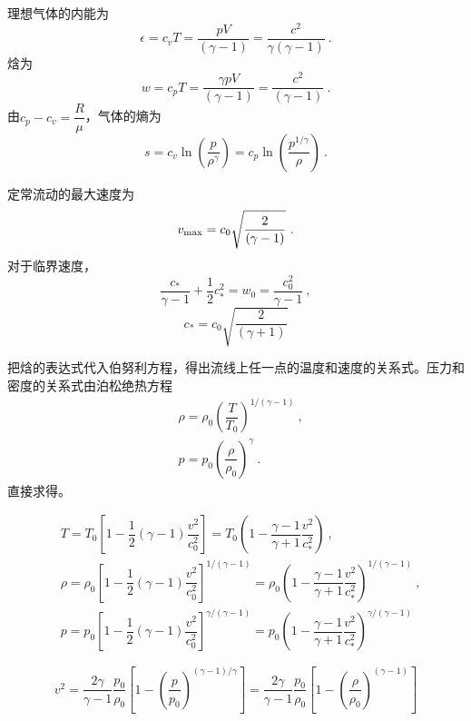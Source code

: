 \documentclass[12pt,a4paper]{article}
\begin{document}
理想气体的内能为
\begin{equation}
\epsilon = c_v T = \dfrac{pV}{(\gamma-1)} = \dfrac{c^2}{\gamma(\gamma-1)} ~.
\end{equation}
焓为
\begin{equation}
w = c_p T = \dfrac{\gamma pV}{(\gamma-1)} = \dfrac{c^2}{(\gamma-1)} ~.
\end{equation}
由$c_p  - c_v = \dfrac{R}{\mu}$，气体的熵为
\begin{equation}
s = c_v \ln \left(\dfrac{p}{\rho^\gamma} \right) = c_p \ln \left(\dfrac{p^{1/\gamma} }{\rho} \right) ~.
\end{equation}

定常流动的最大速度为
\begin{equation}
v_{\rm max} = c_0 \sqrt{\dfrac{2}{(\gamma -1)} } ~.
\end{equation}
对于临界速度，
\begin{equation}
\dfrac{c_\ast}{\gamma-1} +\dfrac{1}{2} c_\ast^2 = w_0 = \dfrac{c_0^2}{\gamma-1} ~,
\end{equation}
\begin{equation}
c_\ast = c_0 \sqrt{\dfrac{2}{(\gamma +1)} } 
\end{equation}

把焓的表达式代入伯努利方程，得出流线上任一点的温度和速度的关系式。压力和密度的关系式由泊松绝热方程
\begin{align}
& \rho = \rho_0 \left( \dfrac{T}{T_0} \right)^{1/(\gamma-1)} ~, \\
& p = p_0 \left( \dfrac{\rho }{\rho_0} \right)^{\gamma}  ~.
\end{align}
直接求得。

\begin{align}
& T = T_0 \left[ 1 - \dfrac{1}{2} (\gamma -1) \dfrac{v^2}{c_0^2} \right] = T_0 \left(1 - \dfrac{\gamma-1}{\gamma+1} \dfrac{v^2}{c_\ast^2} \right) ~, \\
& \rho = \rho_0 \left[ 1 - \dfrac{1}{2} (\gamma -1) \dfrac{v^2}{c_0^2} \right]^{1/(\gamma-1)} = \rho_0 \left(1 - \dfrac{\gamma-1}{\gamma+1} \dfrac{v^2}{c_\ast^2} \right)^{1/(\gamma-1)} ~, \\
& p = p_0 \left[ 1 - \dfrac{1}{2} (\gamma -1) \dfrac{v^2}{c_0^2} \right]^{\gamma/(\gamma-1)} = p_0 \left(1 - \dfrac{\gamma-1}{\gamma+1} \dfrac{v^2}{c_\ast^2} \right)^{\gamma/(\gamma-1)}
\end{align}

\begin{equation}
v^2 = \dfrac{2\gamma}{\gamma-1} \dfrac{p_0}{\rho_0} \left[1 -\left(\dfrac{p}{p_0} \right)^{(\gamma-1)/\gamma} \right] = \dfrac{2\gamma}{\gamma-1} \dfrac{p_0}{\rho_0} \left[1 -\left(\dfrac{\rho}{\rho_0} \right)^{(\gamma-1)} \right] 
\end{equation}
\end{document}
